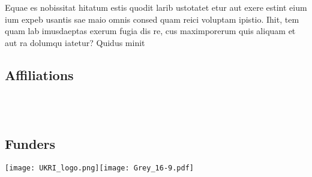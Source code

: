 \documentclass[
]{ImperialPoster}
\begin{document}
\begin{multicols}{3}
	Equae es nobissitat hitatum estis quodit larib ustotatet etur aut exere estint eium ium expeb usantis sae maio omnis consed quam reici voluptam ipistio. Ihit, tem quam lab imusdaeptas exerum fugia dis re, cus maximporerum quis aliquam et aut ra dolumqu iatetur? Quidus minit

	\subsection{Affiliations}

	\\
	\\

	\subsection{Funders}

	\texttt{[image: UKRI\_logo.png]}\hfill\texttt{[image: Grey\_16-9.pdf]} %

\end{multicols}
\end{document}
